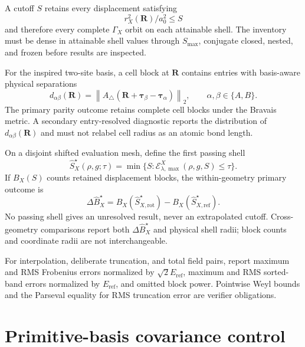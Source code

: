 \documentclass[11pt]{article}
\newcommand{\norm}[1]{\left\lVert #1\right\rVert}
\begin{document}
A cutoff $S$ retains every displacement satisfying
\begin{equation}
 r_X^2(\mathbf R)/a_0^2\le S
\end{equation}
and therefore every complete $\Gamma_X$ orbit on each attainable shell.  The inventory
must be dense in attainable shell values through $S_{\max}$, conjugate closed, nested,
and frozen before results are inspected.

For the inspired two-site basis, a cell block at $\mathbf R$ contains entries with
basis-aware physical separations
\begin{equation}
 d_{\alpha\beta}(\mathbf R)
 =\norm{A_{\triangle}(\mathbf R+\boldsymbol\tau_\beta-
 \boldsymbol\tau_\alpha)}_2,
 \qquad \alpha,\beta\in\{A,B\}.
 \label{eq:basis-aware-distance}
\end{equation}
The primary parity outcome retains complete cell blocks under the Bravais metric.  A
secondary entry-resolved diagnostic reports the distribution of
$d_{\alpha\beta}(\mathbf R)$ and must not relabel cell radius as an atomic bond length.

On a disjoint shifted evaluation mesh, define the first passing shell
\begin{equation}
 \widehat S_X^\star(\rho,g;\tau)
 =\min\{S:\mathcal E_{\lambda,\max}^{X}(\rho,g,S)\le\tau\}.
\end{equation}
If $B_X(S)$ counts retained displacement blocks, the within-geometry primary outcome is
\begin{equation}
 \Delta\widehat B_X^\star
 =B_X(\widehat S_{X,\mathrm{rot}}^\star)
  -B_X(\widehat S_{X,\mathrm{ref}}^\star).
 \label{eq:block-inflation}
\end{equation}
No passing shell gives an unresolved result, never an extrapolated cutoff.  Cross-
geometry comparisons report both $\Delta\widehat B_X^\star$ and physical shell radii;
block counts and coordinate radii are not interchangeable.

For interpolation, deliberate truncation, and total field pairs, report maximum and RMS
Frobenius errors normalized by $\sqrt2E_{\mathrm{ref}}$, maximum and RMS sorted-band errors normalized
by $E_{\mathrm{ref}}$, and omitted block power.  Pointwise Weyl bounds and the Parseval equality for
RMS truncation error are verifier obligations.

\section{Primitive-basis covariance control}
\end{document}
